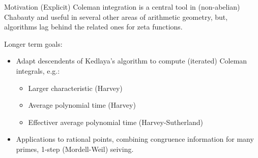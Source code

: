 \documentclass[notheorems]{beamer}
\theoremstyle{plain}
\theoremstyle{definition}
\theoremstyle{definition}
\theoremstyle{definition}
\begin{document}

\begin{frame}{Motivation}
    (Explicit) Coleman integration is a central tool in (non-abelian) Chabauty and useful in several other areas of arithmetic geometry, but, algorithms lag behind the related ones for zeta functions.
    \pause%

    Longer term goals:
    \begin{itemize}[<+->]
        \item Adapt descendents of Kedlaya's algorithm to compute (iterated) Coleman integrals, e.g.:
            \begin{itemize}[<+->]
                \item Larger characteristic (Harvey)
                \item Average polynomial time (Harvey)
                \item Effectiver average polynomial time (Harvey-Sutherland)
            \end{itemize}
        \item Applications to rational points, combining congruence information for many primes, 1-step (Mordell-Weil) seiving.
    \end{itemize}
\end{frame}

\end{document}
